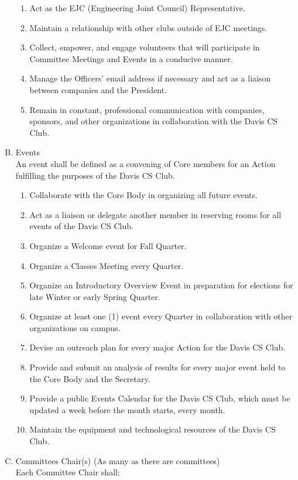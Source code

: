 \documentclass{article}
\newenvironment{li}{
\begin{enumerate}
  \setlength{\itemsep}{1pt}
  \setlength{\parskip}{0pt}
  \setlength{\parsep}{0pt}
}{\end{enumerate}}
\begin{document}
\begin{enumerate}[A.]
	\begin{li}
	\item Act as the EJC (Engineering Joint Council) Representative.
	\item Maintain a relationship with other clubs outside of EJC meetings.
	\item Collect, empower, and engage volunteers that will participate in Committee Meetings and Events in a conducive manner.
	\item Manage the Officers' email address if necessary and act as a liaison between companies and the President.
	\item Remain in constant, professional communication with companies, sponsors, and other organizations in collaboration with the Davis CS Club.
	\end{li}
\item Events\\
An event shall be defined as a convening of Core members for an Action fulfilling the purposes of the Davis CS Club.
	\begin{li}
	\item Collaborate with the Core Body in organizing all future events.
	\item Act as a liaison or delegate another member in reserving rooms for all events of the Davis CS Club.
	\item Organize a Welcome event for Fall Quarter.
	\item Organize a Classes Meeting every Quarter.
	\item Organize an Introductory Overview Event in preparation for elections for late Winter or early Spring Quarter.
	\item Organize at least one (1) event every Quarter in collaboration with other organizations on campus.
	\item Devise an outreach plan for every major Action for the Davis CS Club.
	\item Provide and submit an analysis of results for every major event held to the Core Body and the Secretary.
	\item Provide a public Events Calendar for the Davis CS Club, which must be updated a week before the month starts, every month.
	\item Maintain the equipment and technological resources of the Davis CS Club.
	\end{li}
\item Committees Chair(s) (As many as there are committees)\\
	Each Committee Chair shall:

\end{enumerate}
\end{document}
